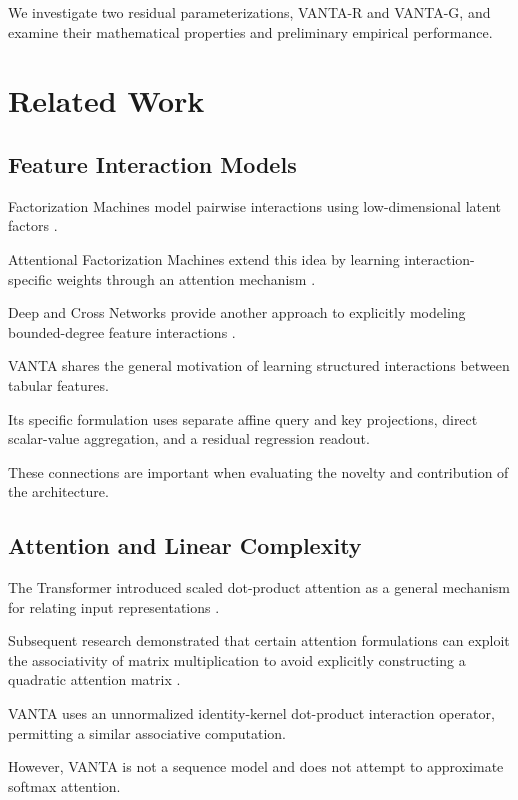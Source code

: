 \documentclass[11pt,a4paper]{article}
\begin{document}
We investigate two residual parameterizations,
VANTA-R and VANTA-G, and examine their
mathematical properties and preliminary
empirical performance.

\section{Related Work}

\subsection{Feature Interaction Models}

Factorization Machines model pairwise interactions
using low-dimensional latent factors
\cite{rendle2010fm}.

Attentional Factorization Machines extend this
idea by learning interaction-specific weights
through an attention mechanism
\cite{xiao2017afm}.

Deep and Cross Networks provide another approach
to explicitly modeling bounded-degree feature
interactions \cite{wang2017dcn}.

VANTA shares the general motivation of learning
structured interactions between tabular features.

Its specific formulation uses separate affine
query and key projections, direct scalar-value
aggregation, and a residual regression readout.

These connections are important when evaluating
the novelty and contribution of the architecture.

\subsection{Attention and Linear Complexity}

The Transformer introduced scaled dot-product
attention as a general mechanism for relating
input representations \cite{vaswani2017attention}.

Subsequent research demonstrated that certain
attention formulations can exploit the
associativity of matrix multiplication to avoid
explicitly constructing a quadratic attention
matrix \cite{katharopoulos2020linear}.

VANTA uses an unnormalized identity-kernel
dot-product interaction operator, permitting
a similar associative computation.

However, VANTA is not a sequence model and does
not attempt to approximate softmax attention.
\end{document}
